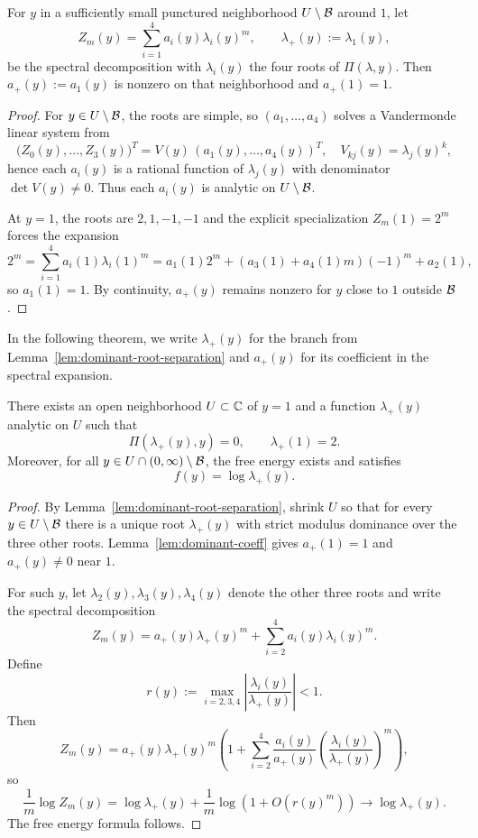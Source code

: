\begin{lemma}\label{lem:dominant-coeff}
For $y$ in a sufficiently small punctured neighborhood $U\setminus\mathcal{B}$ around $1$, let
\[
Z_m(y)=\sum_{i=1}^4 a_i(y)\lambda_i(y)^m,\qquad \lambda_+(y):=\lambda_1(y),
\]
be the spectral decomposition with $\lambda_i(y)$ the four roots of $\Pi(\lambda,y)$.
Then $a_+(y):=a_1(y)$ is nonzero on that neighborhood and $a_+(1)=1$.

\begin{proof}
For $y\in U\setminus\mathcal{B}$, the roots are simple, so $(a_1,\dots,a_4)$ solves a Vandermonde linear system from
\[
\bigl(Z_0(y),\dots,Z_3(y)\bigr)^T=V(y)\,(a_1(y),\dots,a_4(y))^T,\quad
V_{kj}(y)=\lambda_j(y)^k,
\]
hence each $a_i(y)$ is a rational function of $\lambda_j(y)$ with denominator $\det V(y)\neq0$.
Thus each $a_i(y)$ is analytic on $U\setminus\mathcal{B}$.

At $y=1$, the roots are $2,1,-1,-1$ and the explicit specialization $Z_m(1)=2^m$ forces the expansion
\[
2^m=\sum_{i=1}^4 a_i(1)\lambda_i(1)^m=a_1(1)2^m+(a_3(1)+a_4(1)m)(-1)^m+a_2(1),
\]
so $a_1(1)=1$.
By continuity, $a_+(y)$ remains nonzero for $y$ close to $1$ outside $\mathcal{B}$.
\end{proof}
\end{lemma}

In the following theorem, we write $\lambda_+(y)$ for the branch from
Lemma~\ref{lem:dominant-root-separation} and $a_+(y)$ for its coefficient in the spectral expansion.
\begin{theorem}\label{thm:lambda-plus}
There exists an open neighborhood $U\subset\mathbb{C}$ of $y=1$ and a function $\lambda_+(y)$
analytic on $U$ such that
\[
\Pi(\lambda_+(y),y)=0,\qquad \lambda_+(1)=2.
\]
Moreover, for all $y\in U\cap(0,\infty)\setminus\mathcal{B}$, the free energy exists and satisfies
\[
f(y)=\log \lambda_+(y).
\]
\end{theorem}

\begin{proof}
By Lemma~\ref{lem:dominant-root-separation}, shrink $U$ so that for every
$y\in U\setminus\mathcal{B}$ there is a unique root $\lambda_+(y)$ with strict
modulus dominance over the three other roots.
Lemma~\ref{lem:dominant-coeff} gives $a_+(1)=1$ and $a_+(y)\neq0$ near $1$.

For such $y$, let $\lambda_2(y),\lambda_3(y),\lambda_4(y)$ denote the other
three roots and write the spectral decomposition
\[
Z_m(y)=a_+(y)\lambda_+(y)^m+\sum_{i=2}^4 a_i(y)\lambda_i(y)^m.
\]
Define
\[
r(y):=\max_{i=2,3,4}\left|\frac{\lambda_i(y)}{\lambda_+(y)}\right|<1.
\]
Then
\[
Z_m(y)=a_+(y)\lambda_+(y)^m\!\left(1+\sum_{i=2}^4 \frac{a_i(y)}{a_+(y)}\left(\frac{\lambda_i(y)}{\lambda_+(y)}\right)^m\right),
\]
so
\[
\frac{1}{m}\log Z_m(y)=\log\lambda_+(y)+\frac{1}{m}\log\!\left(1+O(r(y)^m)\right)\to\log\lambda_+(y).
\]
The free energy formula follows.
\end{proof}


